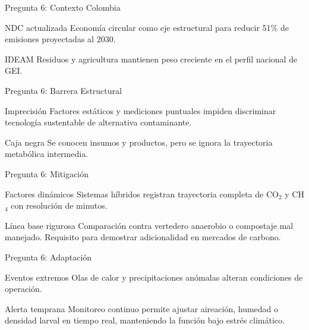 \documentclass[aspectratio=169, 11pt]{beamer}
\begin{document}
\begin{frame}{Pregunta 6: Contexto Colombia}
\begin{block}{NDC actualizada}
\footnotesize
Economía circular como eje estructural para reducir 51\% de emisiones proyectadas al 2030.
\end{block}
\begin{exampleblock}{IDEAM}
\footnotesize
Residuos y agricultura mantienen peso creciente en el perfil nacional de GEI.
\end{exampleblock}
\end{frame}

\begin{frame}{Pregunta 6: Barrera Estructural}
\begin{alertblock}{Imprecisión}
\footnotesize
Factores estáticos y mediciones puntuales impiden discriminar tecnología sustentable de alternativa contaminante.
\end{alertblock}
\begin{block}{Caja negra}
\footnotesize
Se conocen insumos y productos, pero se ignora la trayectoria metabólica intermedia.
\end{block}
\end{frame}

\begin{frame}{Pregunta 6: Mitigación}
\begin{exampleblock}{Factores dinámicos}
\footnotesize
Sistemas híbridos registran trayectoria completa de CO$_2$ y CH$_4$ con resolución de minutos.
\end{exampleblock}
\begin{block}{Línea base rigurosa}
\footnotesize
Comparación contra vertedero anaerobio o compostaje mal manejado. Requisito para demostrar adicionalidad en mercados de carbono.
\end{block}
\end{frame}

\begin{frame}{Pregunta 6: Adaptación}
\begin{exampleblock}{Eventos extremos}
\footnotesize
Olas de calor y precipitaciones anómalas alteran condiciones de operación.
\end{exampleblock}
\begin{block}{Alerta temprana}
\footnotesize
Monitoreo continuo permite ajustar aireación, humedad o densidad larval en tiempo real, manteniendo la función bajo estrés climático.
\end{block}
\end{frame}
\end{document}
